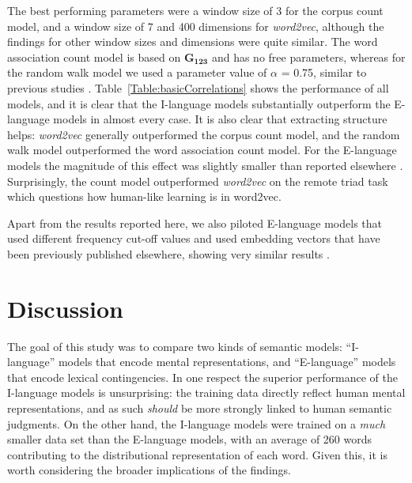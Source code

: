\documentclass{article}
\begin{document}
The best performing parameters were a window size of 3 for the corpus count model, and a window size of 7 and 400 dimensions for {\it word2vec}, although the findings for other window sizes and dimensions were quite similar. The word association count model is based on $\mathbf{G_{123}}$ and has no free parameters, whereas for the random walk model we used a parameter value of $\alpha$ = 0.75, similar to previous studies \cite{DeDeyne2016JEP}. Table~\ref{Table:basicCorrelations} shows the performance of all models, and it is clear that the I-language models substantially outperform the E-language models in almost every case. It is also clear that extracting structure helps: {\it word2vec} generally outperformed the corpus count model, and the random walk model outperformed the word association count model. For the E-language models the magnitude of this effect was slightly smaller than reported elsewhere \cite{BaroniDinu2014,Mandera2016Semantic}. Surprisingly, the count model outperformed {\it word2vec} on the remote triad task which questions how human-like learning is in word2vec.

Apart from the results reported here, we also piloted E-language models that used different frequency cut-off values and used embedding vectors that have been previously published elsewhere, showing very similar results \cite{DeDeyne2016ACL}.

\section{Discussion}
\label{sec:discussion}

The goal of this study was to compare two kinds of semantic models: ``I-language'' models that encode mental representations, and ``E-language'' models that encode lexical contingencies. In one respect the superior performance of the I-language models is unsurprising: the training data directly reflect human mental representations, and as such {\it should} be more strongly linked to human semantic judgments. On the other hand, the I-language models were trained on a {\it much} smaller data set than the E-language models, with an average of 260 words contributing to the distributional representation of each word. Given this, it is worth considering the broader implications of the findings.
\end{document}
